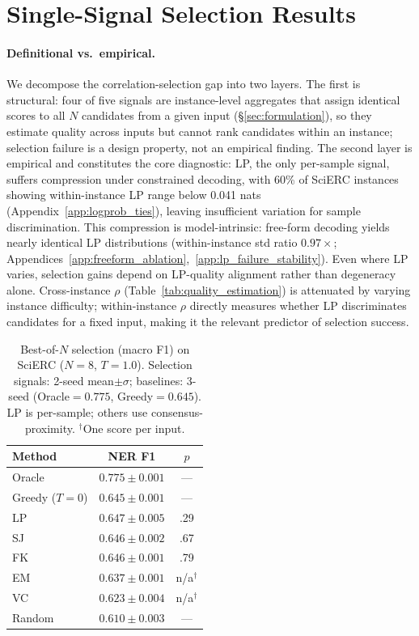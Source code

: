 \section{Single-Signal Selection Results}\label{sec:selection_gap}

\paragraph{Definitional vs.\ empirical.}
We decompose the correlation-selection gap into two layers.
The first is structural: four of five signals are instance-level aggregates that assign identical scores to all $N$ candidates from a given input (\S\ref{sec:formulation}), so they estimate quality across inputs but cannot rank candidates within an instance; selection failure is a design property, not an empirical finding.
The second layer is empirical and constitutes the core diagnostic: LP, the only per-sample signal, suffers compression under constrained decoding, with 60\% of SciERC instances showing within-instance LP range below 0.041 nats (Appendix~\ref{app:logprob_ties}), leaving insufficient variation for sample discrimination. This compression is model-intrinsic: free-form decoding yields nearly identical LP distributions (within-instance std ratio $0.97{\times}$; Appendices~\ref{app:freeform_ablation},~\ref{app:lp_failure_stability}). Even where LP varies, selection gains depend on LP-quality alignment rather than degeneracy alone.
Cross-instance $\rho$ (Table~\ref{tab:quality_estimation}) is attenuated by varying instance difficulty; within-instance $\rho$ directly measures whether LP discriminates candidates for a fixed input, making it the relevant predictor of selection success.

\begin{table}[t]
\centering
\small
\caption{Best-of-$N$ selection (macro F1) on SciERC ($N{=}8$, $T{=}1.0$). Selection signals: 2-seed mean${\pm}\sigma$; baselines: 3-seed (Oracle${=}0.775$, Greedy${=}0.645$). LP is per-sample; others use consensus-proximity. $^\dagger$One score per input.}
\label{tab:selection}
\begin{tabular}{lcc}
\toprule
Method & NER F1 & $p$ \\
\midrule
Oracle & $0.775 \pm 0.001$ & --- \\
Greedy ($T{=}0$) & $0.645 \pm 0.001$ & --- \\
\midrule
LP           & $\mathbf{0.647} \pm 0.005$ & .29 \\
SJ           & $0.646 \pm 0.002$ & .67 \\
FK           & $0.646 \pm 0.001$ & .79 \\
EM           & $0.637 \pm 0.001$ & n/a$^\dagger$ \\
VC           & $0.623 \pm 0.004$ & n/a$^\dagger$ \\
\midrule
Random       & $0.610 \pm 0.003$ & --- \\
\bottomrule
\end{tabular}
\end{table}

